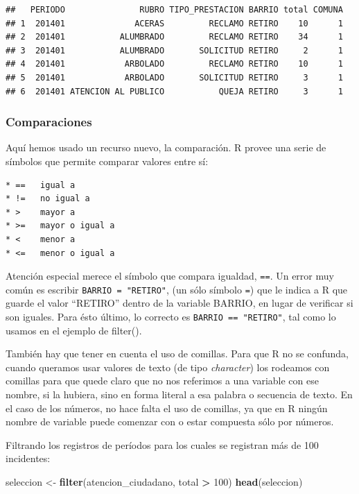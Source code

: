 \documentclass[]{book}
\newenvironment{Shaded}{\begin{snugshade}}{\end{snugshade}}
\newcommand{\KeywordTok}[1]{\textcolor[rgb]{0.13,0.29,0.53}{\textbf{#1}}}
\newcommand{\DecValTok}[1]{\textcolor[rgb]{0.00,0.00,0.81}{#1}}
\newcommand{\StringTok}[1]{\textcolor[rgb]{0.31,0.60,0.02}{#1}}
\newcommand{\OperatorTok}[1]{\textcolor[rgb]{0.81,0.36,0.00}{\textbf{#1}}}
\newcommand{\NormalTok}[1]{#1}
\begin{document}
\begin{verbatim}
##   PERIODO               RUBRO TIPO_PRESTACION BARRIO total COMUNA
## 1  201401              ACERAS         RECLAMO RETIRO    10      1
## 2  201401           ALUMBRADO         RECLAMO RETIRO    34      1
## 3  201401           ALUMBRADO       SOLICITUD RETIRO     2      1
## 4  201401            ARBOLADO         RECLAMO RETIRO    10      1
## 5  201401            ARBOLADO       SOLICITUD RETIRO     3      1
## 6  201401 ATENCION AL PUBLICO           QUEJA RETIRO     3      1
\end{verbatim}

\subsubsection{Comparaciones}\label{comparaciones}

Aquí hemos usado un recurso nuevo, la comparación. R provee una serie de
símbolos que permite comparar valores entre sí:

\begin{verbatim}
* ==   igual a 
* !=   no igual a 
* >    mayor a 
* >=   mayor o igual a 
* <    menor a 
* <=   menor o igual a 
\end{verbatim}

Atención especial merece el símbolo que compara igualdad, \texttt{==}.
Un error muy común es escribir \texttt{BARRIO\ =\ "RETIRO"}, (un sólo
símbolo \texttt{=}) que le indica a R que guarde el valor ``RETIRO''
dentro de la variable BARRIO, en lugar de verificar si son iguales. Para
ésto último, lo correcto es \texttt{BARRIO\ ==\ "RETIRO"}, tal como lo
usamos en el ejemplo de filter().

También hay que tener en cuenta el uso de comillas. Para que R no se
confunda, cuando queramos usar valores de texto (de tipo
\emph{character}) los rodeamos con comillas para que quede claro que no
nos referimos a una variable con ese nombre, si la hubiera, sino en
forma literal a esa palabra o secuencia de texto. En el caso de los
números, no hace falta el uso de comillas, ya que en R ningún nombre de
variable puede comenzar con o estar compuesta sólo por números.

Filtrando los registros de períodos para los cuales se registran más de
100 incidentes:

\begin{Shaded}
\begin{Highlighting}[]
\NormalTok{seleccion <-}\StringTok{ }\KeywordTok{filter}\NormalTok{(atencion_ciudadano, total }\OperatorTok{>}\StringTok{ }\DecValTok{100}\NormalTok{)}
\KeywordTok{head}\NormalTok{(seleccion)}
\end{Highlighting}
\end{Shaded}
\end{document}
